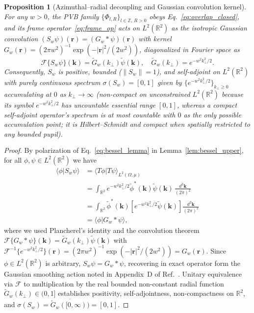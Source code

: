 \documentclass[aps,pra,onecolumn,notitlepage,11pt,tightenlines,nofootinbib,floatfix,longbibliography]{revtex4-2}
\newtheorem{proposition}{Proposition}
\theoremstyle{remark}
\newcommand{\braket}[2]{\langle #1 | #2 \rangle}
\newcommand{\norm}[1]{\lVert #1 \rVert}
\newcommand{\abs}[1]{\lvert #1 \rvert}
\begin{document}
\begin{proposition}[Azimuthal--radial decoupling and Gaussian convolution kernel]
\label{prop:conv_kernel}
For any $w > 0$, the PVB family $\{\Phi_{l,R}\}_{l\in\mathbb{Z},\,R>0}$ obeys Eq.~\eqref{eq:overlap_closed}, and its frame operator~\eqref{eq:frame_op} acts on $L^2(\mathbb{R}^2)$ as the isotropic Gaussian convolution $(S_w\psi)(\mathbf{r}) = (G_w * \psi)(\mathbf{r})$ with kernel $G_w(\mathbf{r}) = (2\pi w^2)^{-1}\exp(-\abs{\mathbf{r}}^2/(2w^2))$, diagonalized in Fourier space as
\begin{equation}
\mathcal{F}\{S_w\psi\}(\mathbf{k}) = \widetilde{G}_w(k_\perp)\widetilde{\psi}(\mathbf{k}), \quad \widetilde{G}_w(k_\perp) = e^{-w^2 k_\perp^2/2}.
\label{eq:fourier_diag}
\end{equation}
Consequently, $S_w$ is positive, bounded ($\norm{S_w} = 1$), and self-adjoint on $L^2(\mathbb{R}^2)$ with purely continuous spectrum $\sigma(S_w) = [0,1]$ given by $\{e^{-w^2 k_\perp^2/2}\}_{k_\perp \ge 0}$ accumulating at $0$ as $k_\perp \to \infty$ (non-compact on unconstrained $L^2(\mathbb{R}^2)$ because its symbol $e^{-w^2 k_\perp^2/2}$ has uncountable essential range $[0,1]$, whereas a compact self-adjoint operator's spectrum is at most countable with $0$ as the only possible accumulation point; it is Hilbert--Schmidt and compact when spatially restricted to any bounded pupil).
\end{proposition}
\begin{proof}
By polarization of Eq.~\eqref{eq:bessel_lemma} in Lemma~\ref{lem:bessel_upper}, for all $\phi,\psi \in L^2(\mathbb{R}^2)$ we have
\begin{align}
\braket{\phi}{S_w\psi} &= \braket{T\phi}{T\psi}_{L^2(\Omega,\mu)} \nonumber \\
&= \int_{\mathbb{R}^2} e^{-w^2 k_\perp^2/2}\widetilde{\phi}^*(\mathbf{k})\widetilde{\psi}(\mathbf{k})\,\frac{d^2\mathbf{k}}{(2\pi)^2} \nonumber \\
&= \int_{\mathbb{R}^2} \widetilde{\phi}^*(\mathbf{k})\!\left[e^{-w^2 k_\perp^2/2}\widetilde{\psi}(\mathbf{k})\right]\frac{d^2\mathbf{k}}{(2\pi)^2} \nonumber \\
&= \braket{\phi}{G_w * \psi},
\label{eq:prop1_polarization}
\end{align}
where we used Plancherel's identity and the convolution theorem $\mathcal{F}\{G_w * \psi\}(\mathbf{k}) = \widetilde{G}_w(k_\perp)\widetilde{\psi}(\mathbf{k})$ with $\mathcal{F}^{-1}\{e^{-w^2 k_\perp^2/2}\}(\mathbf{r}) = \allowbreak (2\pi w^2)^{-1}\exp(-\abs{\mathbf{r}}^2/(2w^2)) = G_w(\mathbf{r})$. Since $\phi \in L^2(\mathbb{R}^2)$ is arbitrary, $S_w\psi = G_w * \psi$, recovering in exact operator form the Gaussian smoothing action noted in Appendix~D of Ref.~\cite{Ferreira2026}. Unitary equivalence via $\mathcal{F}$ to multiplication by the real bounded non-constant radial function $\widetilde{G}_w(k_\perp) \in (0,1]$ establishes positivity, self-adjointness, non-compactness on $\mathbb{R}^2$, and $\sigma(S_w) = \overline{\widetilde{G}_w([0,\infty))} = [0,1]$.
\end{proof}
\end{document}
